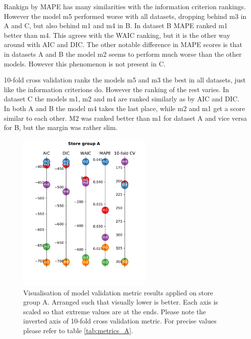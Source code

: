 \documentclass[english, 12pt, a4paper, sci, utf8, a-1b, online]{aaltothesis}
\begin{document}
Rankign by MAPE has many similarities with the information criterion rankings. However the model m5 performed worse with all 
datasets, dropping behind m3 in A and C, but also behind m1 and m4 in B. In dataset B MAPE ranked m1 better than m4. This agrees
with the WAIC ranking, but it is the other way around with AIC and DIC. The other notable difference in MAPE scores is that in datasets
A and B the model m2 seems to perform much worse than the other models. However this phenomenon is not present in C. 

10-fold cross validation ranks the models m5 and m3 the best in all datasets, just like the information criterions do. However the
ranking of the rest varies. In dataset C the models m1, m2 and m4 are ranked similarly as by AIC and DIC. In both A and B the model m4
takes the last place, while m2 and m1 get a score similar to each other. M2 was ranked better than m1 for dataset A and vice versa for B, but
the margin was rather slim.







\begin{figure}[htb]
	\centering
	\includegraphics[height=8cm]{../plots/metrics/metrics_plot_A.pdf}
	\caption{Visualisation of model validation metric results applied on store group A. Arranged such that visually lower is better.
	Each axis is scaled so that extreme values are at the ends. Please note the inverted axis of 10-fold cross validation metric. For 
	precise values please refer to table \ref{tab:metrics_A}.
	}
	\label{fig:metrics_A}
\end{figure}
\end{document}
